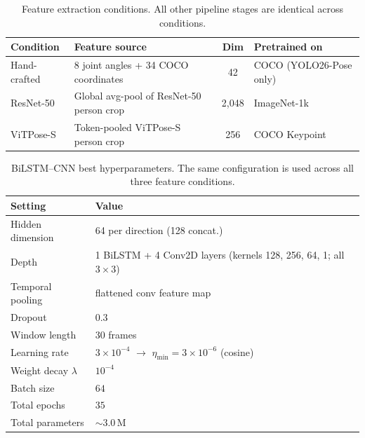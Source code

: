 \documentclass[conference,onecolumn,oneside]{IEEEtran}
\begin{document}
\begin{table}[H]
\centering
\caption{Feature extraction conditions. All other pipeline stages
are identical across conditions.}
\label{tab:conditions}
\small
\renewcommand{\arraystretch}{1.15}
\begin{tabular}{|l|l|c|l|}
\hline
\textbf{Condition} & \textbf{Feature source} & \textbf{Dim} &
\textbf{Pretrained on} \\
\hline
Hand-crafted & 8 joint angles + 34 COCO coordinates & 42 &
  COCO (YOLO26-Pose only) \\
ResNet-50    & Global avg-pool of ResNet-50 person crop & 2{,}048 &
  ImageNet-1k \\
ViTPose-S    & Token-pooled ViTPose-S person crop & 256 &
  COCO Keypoint~\cite{xu2022vitpose} \\
\hline
\end{tabular}
\end{table}

\begin{table}[H]
\centering
\caption{BiLSTM--CNN best hyperparameters. The same configuration is used
across all three feature conditions.}
\label{tab:bilstm_hparams}
\small
\renewcommand{\arraystretch}{1.15}
\begin{tabular}{|l|l|}
\hline
\textbf{Setting} & \textbf{Value} \\
\hline
Hidden dimension      & 64 per direction (128 concat.) \\
Depth                 & 1 BiLSTM + 4 Conv2D layers (kernels 128, 256, 64, 1; all $3{\times}3$) \\
Temporal pooling      & flattened conv feature map \\
Dropout               & $0.3$ \\
Window length         & 30 frames \\
Learning rate         & $3 \times 10^{-4}$ $\rightarrow$ $\eta_{\min} = 3 \times 10^{-6}$ (cosine) \\
Weight decay $\lambda$& $10^{-4}$ \\
Batch size            & $64$ \\
Total epochs          & $35$ \\
Total parameters      & $\sim$3.0\,M \\
\hline
\end{tabular}
\end{table}
\end{document}
